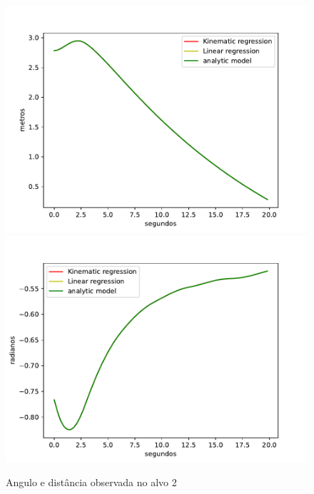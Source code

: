 \begin{figure}[H]
    \centering
    \includegraphics[scale=0.3]{figuras/distance_over_time_2.pdf}
    \hspace{1cm}
    \includegraphics[scale=0.3]{figuras/angle_over_time_2.pdf}
    \caption{Angulo e distância observada no alvo 2}
\end{figure}

